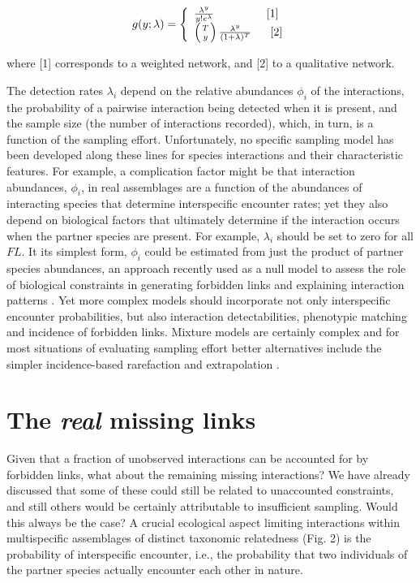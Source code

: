 \documentclass[12pt]{article}
\begin{document}
\[ 
g(y;\lambda) =  \left\{
\begin{array}{ll}
\frac{\lambda^y}{y!e^{\lambda}} \ \ \ \ \ \ \ \ \ \ \ \ \ \ [1]\\
\left({T\above 0pt y}\right) \frac{\lambda^y}{(1+\lambda)^T} \ \ \ \ \ [2]
\end{array}%
\right.
\]

where [1] corresponds to a weighted network, and [2] to a qualitative network.

The detection rates $\lambda_i$ depend on the relative abundances $\phi_i$ of the interactions, the probability of a pairwise interaction being detected when it is present, and the sample size (the number of interactions recorded), which, in turn, is a function of the sampling effort. Unfortunately, no specific sampling model has been developed along these lines for species interactions and their characteristic features. For example, a complication factor might be that interaction abundances, $\phi_i$, in real assemblages are a function of the abundances of interacting species that determine interspecific encounter rates; yet they also depend on biological factors that ultimately determine if the interaction occurs when the partner species are present. For example, $\lambda_i$ should be set to zero for all $FL$. It its simplest form, $\phi_i$ could be estimated from just the product of partner species abundances, an approach recently used as a null model to assess the role of biological constraints in generating forbidden links and explaining interaction patterns \citep{Vizentin-Bugoni:2014hc}. Yet more complex models \citeyearpar[e.g., Wells \& O'hara ][]{Wells:2012dy,Bartomeus:2016aa} should incorporate not only interspecific encounter probabilities, but also interaction detectabilities, phenotypic matching and incidence of forbidden links. Mixture models are certainly complex and for most situations of evaluating sampling effort better alternatives include the simpler incidence-based rarefaction and extrapolation \citep{Colwell:2012fc,Chao:2014wm}.  

\section*{The \emph{real} missing links}
\label{therealmissinglinks}

Given that a fraction of unobserved interactions can be accounted for by forbidden links, what about the remaining missing interactions? We have already discussed that some of these could still be related to unaccounted constraints, and still others would be certainly attributable to insufficient sampling. Would this always be the case? A crucial ecological aspect limiting interactions within multispecific assemblages of distinct taxonomic relatedness (Fig. 2) is the probability of interspecific encounter, i.e., the probability that two individuals of the partner species actually encounter each other in nature. 
\end{document}
